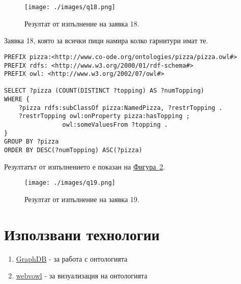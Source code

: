 \documentclass[12pt]{article}
\begin{document}
        \begin{center}
            \begin{figure}
            \centering
                \texttt{[image: ./images/q18.png]}
                \caption{Резултат от изпълнение на заявка 18.}
                \label{fig:q18}
            \end{figure}
        \end{center}
        
\clearpage
\pagebreak

        Заявка 18, която за всички пици намира колко гарнитури имат те.

        \begin{lstlisting}[language=SPARQL,style=sparql]
PREFIX pizza:<http://www.co-ode.org/ontologies/pizza/pizza.owl#>
PREFIX rdfs: <http://www.w3.org/2000/01/rdf-schema#>
PREFIX owl: <http://www.w3.org/2002/07/owl#>

SELECT ?pizza (COUNT(DISTINCT ?topping) AS ?numTopping)
WHERE {
    ?pizza rdfs:subClassOf pizza:NamedPizza, ?restrTopping .
    ?restrTopping owl:onProperty pizza:hasTopping ;
                owl:someValuesFrom ?topping .
}
GROUP BY ?pizza
ORDER BY DESC(?numTopping) ASC(?pizza)\end{lstlisting}

        Резултатът от изпълнението е показан на \hyperref[fig:q19]{Фигура~\ref*{fig:q19}}.

        \begin{center}
            \begin{figure}
            \centering
                \texttt{[image: ./images/q19.png]}
                \caption{Резултат от изпълнение на заявка 19.}
                \label{fig:q19}
            \end{figure}
        \end{center}
        
\clearpage
\pagebreak

\section{Използвани технологии}

    \begin{enumerate}
    
    \item \href{https://ontotext.com/products/graphdb/}{GraphDB} - за работа с онтологията
    \item \href{http://vowl.visualdataweb.org/webvowl-old/webvowl-old.html}{webvowl} - за визуализация на онтологията
        
    \end{enumerate}
\end{document}
